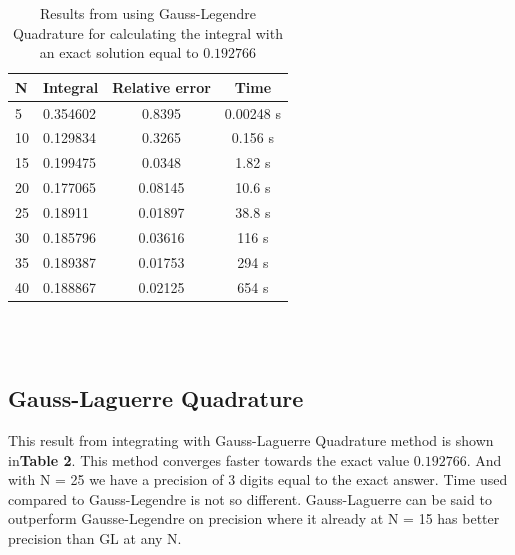 \documentclass[twoside,twocolumn]{article}
\begin{document}
\begin{table}[h]
\centering
\begin{tabular}{|l|l|c|c|}
\hline
N  & Integral & \multicolumn{1}{l|}{Relative error} & Time      \\ \hline
5  & 0.354602 & 0.8395                              & 0.00248 s \\ \hline
10 & 0.129834 & 0.3265                              & 0.156 s   \\ \hline
15 & 0.199475 & 0.0348                              & 1.82 s    \\ \hline
20 & 0.177065 & 0.08145                             & 10.6 s    \\ \hline
25 & 0.18911  & 0.01897                             & 38.8 s    \\ \hline
30 & 0.185796 & 0.03616                             & 116 s     \\ \hline
35 & 0.189387 & 0.01753                             & 294 s     \\ \hline
40 & 0.188867 & 0.02125                             & 654 s     \\ \hline
\end{tabular}
\caption{Results from using Gauss-Legendre Quadrature for calculating the integral with an exact solution equal to $0.192766$}
\end{table}
\ \
 \\
 \\


\subsection{Gauss-Laguerre Quadrature}
This result from integrating with Gauss-Laguerre Quadrature method is shown in\textbf{Table 2}. This method converges faster towards the exact value  $0.192766$. And with N = 25 we have a precision of 3 digits equal to the exact answer. Time used compared to Gauss-Legendre is not so different. Gauss-Laguerre can be said to outperform Gausse-Legendre on precision where it already at N = 15 has better precision than GL at any N.
\end{document}
